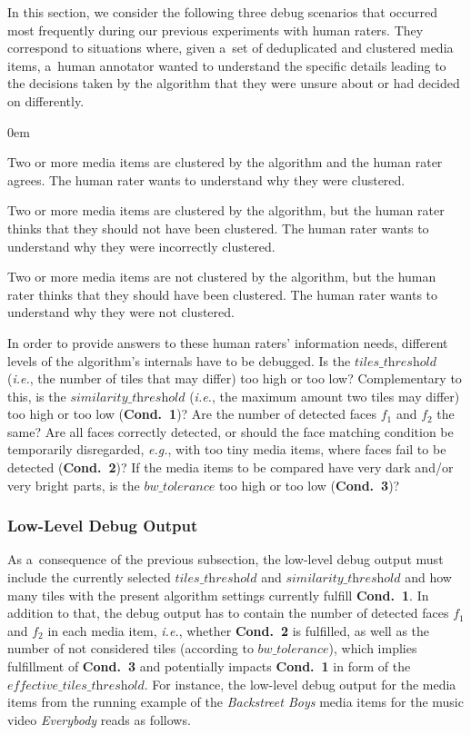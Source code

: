 In this section, we consider the following three debug scenarios
that occurred most frequently during our previous experiments with human raters.
They correspond to situations where, given a~set of
deduplicated and clustered media items, a~human annotator wanted
to understand the specific details leading to the decisions
taken by the algorithm that they were unsure about or had decided on differently.

\begin{description}
  \itemsep0em
  \item[Clustering Consent.] Two or more media items are clustered
    by the algorithm and the human rater agrees.
    The human rater wants to understand why they were clustered.
  \item[Clustering Dissent.] Two or more media items are clustered
    by the algorithm, but the human rater thinks
    that they should not have been clustered.
    The human rater wants to understand why they were incorrectly clustered.
  \item[Non-Clustering Dissent.] Two or more media items are not clustered
  by the algorithm, but the human rater thinks
  that they should have been clustered.
  The human rater wants to understand why they were not clustered.
\end{description}

In order to provide answers to these human raters' information needs,
different levels of the algorithm's internals have to be debugged.
Is the $\textit{tiles\_threshold}$ (\emph{i.e.},
the number of tiles that may differ) too high or too low?
Complementary to this, is the $\textit{similarity\_threshold}$
(\emph{i.e.}, the maximum amount two tiles may differ)
too high or too low (\textbf{Cond.~1})?
Are the number of detected faces $f_1$ and $f_2$ the same?
Are all faces correctly detected, or should the face matching condition
be temporarily disregarded, \emph{e.g.}, with too tiny media items,
where faces fail to be detected (\textbf{Cond.~2})?
If the media items to be compared have very dark and/or very bright parts,
is the $\textit{bw\_tolerance}$ too high or too low (\textbf{Cond.~3})?

\subsubsection{Low-Level Debug Output}
\label{sec:low-level-debug-output}

As a~consequence of the previous subsection, the low-level debug output
must include the currently selected $\textit{tiles\_threshold}$ and
$\textit{similarity\_threshold}$ and how many tiles with the present algorithm settings
currently fulfill \textbf{Cond.~1}.
In addition to that, the debug output has to contain
the number of detected faces $f_1$ and $f_2$ in each media item,
\emph{i.e.}, whether \textbf{Cond.~2} is fulfilled,
as well as the number of not considered tiles
(according to $\textit{bw\_tolerance}$), which implies fulfillment of \textbf{Cond.~3}
and potentially impacts \textbf{Cond.~1} in form of
the $\textit{effective\_tiles\_threshold}$.
For instance, the low-level debug output for the media items
from the running example of the \emph{Backstreet Boys} media items
for the music video \emph{Everybody} reads as follows.

